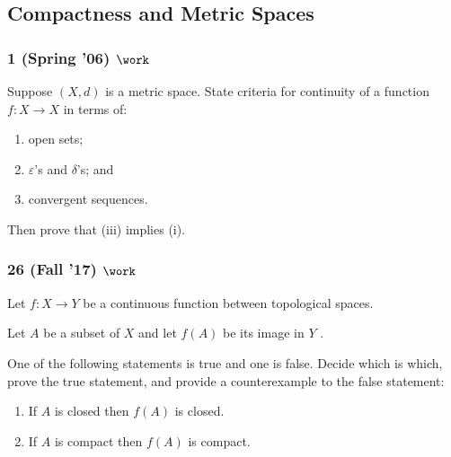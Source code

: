\hypertarget{compactness-and-metric-spaces}{%
\subsection{Compactness and Metric
Spaces}\label{compactness-and-metric-spaces}}

\hypertarget{spring-06-work}{%
\subsubsection{\texorpdfstring{1 (Spring '06)
\(\work\)}{1 (Spring '06) \textbackslash work}}\label{spring-06-work}}

\begin{problem}[?]

Suppose \((X, d)\) is a metric space. State criteria for continuity of a
function \(f : X \to X\) in terms of:

\begin{enumerate}
\def\labelenumi{\roman{enumi}.}
\item
  open sets;
\item
  \(\varepsilon\)'s and \(\delta\)'s; and
\item
  convergent sequences.
\end{enumerate}

Then prove that (iii) implies (i).

\end{problem}

\hypertarget{fall-17-work}{%
\subsubsection{\texorpdfstring{26 (Fall '17)
\(\work\)}{26 (Fall '17) \textbackslash work}}\label{fall-17-work}}

\begin{problem}[?]

Let \(f : X \to Y\) be a continuous function between topological spaces.

Let \(A\) be a subset of \(X\) and let \(f (A)\) be its image in \(Y\) .

One of the following statements is true and one is false. Decide which
is which, prove the true statement, and provide a counterexample to the
false statement:

\begin{enumerate}
\def\labelenumi{\arabic{enumi}.}
\item
  If \(A\) is closed then \(f (A)\) is closed.
\item
  If \(A\) is compact then \(f (A)\) is compact.
\end{enumerate}

\end{problem}

